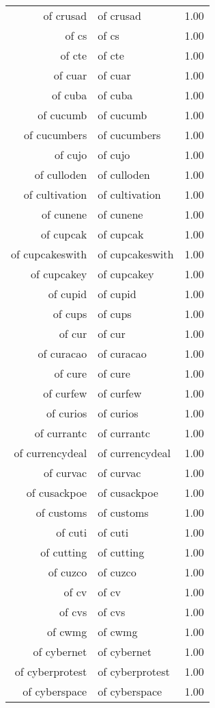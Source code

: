 \begin{table}[ht]
\begin{tabular}{rlr}
  of crusad & of crusad & 1.00 \\ 
  of cs & of cs & 1.00 \\ 
  of cte & of cte & 1.00 \\ 
  of cuar & of cuar & 1.00 \\ 
  of cuba & of cuba & 1.00 \\ 
  of cucumb & of cucumb & 1.00 \\ 
  of cucumbers & of cucumbers & 1.00 \\ 
  of cujo & of cujo & 1.00 \\ 
  of culloden & of culloden & 1.00 \\ 
  of cultivation & of cultivation & 1.00 \\ 
  of cunene & of cunene & 1.00 \\ 
  of cupcak & of cupcak & 1.00 \\ 
  of cupcakeswith & of cupcakeswith & 1.00 \\ 
  of cupcakey & of cupcakey & 1.00 \\ 
  of cupid & of cupid & 1.00 \\ 
  of cups & of cups & 1.00 \\ 
  of cur & of cur & 1.00 \\ 
  of curacao & of curacao & 1.00 \\ 
  of cure & of cure & 1.00 \\ 
  of curfew & of curfew & 1.00 \\ 
  of curios & of curios & 1.00 \\ 
  of currantc & of currantc & 1.00 \\ 
  of currencydeal & of currencydeal & 1.00 \\ 
  of curvac & of curvac & 1.00 \\ 
  of cusackpoe & of cusackpoe & 1.00 \\ 
  of customs & of customs & 1.00 \\ 
  of cuti & of cuti & 1.00 \\ 
  of cutting & of cutting & 1.00 \\ 
  of cuzco & of cuzco & 1.00 \\ 
  of cv & of cv & 1.00 \\ 
  of cvs & of cvs & 1.00 \\ 
  of cwmg & of cwmg & 1.00 \\ 
  of cybernet & of cybernet & 1.00 \\ 
  of cyberprotest & of cyberprotest & 1.00 \\ 
  of cyberspace & of cyberspace & 1.00 \\ 

\end{tabular}
\end{table}
